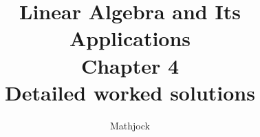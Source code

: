 
\title{\textbf{Linear Algebra and Its Applications}\\[0.3em]Chapter 4\\[0.3em]\large Detailed worked solutions}
\author{Mathjock}
\date{}

\maketitle
\bookinfo
\tableofcontents
\clearpage
\renewcommand{\thesection}{4.\arabic{section}}
\renewcommand{\theHsection}{4.\arabic{section}}
\setcounter{section}{0}

\clearpage
\renewcommand{\thesection}{4.\arabic{section}}
\renewcommand{\theHsection}{4.\arabic{section}}
\setcounter{section}{1}

\clearpage
\renewcommand{\thesection}{4.\arabic{section}}
\renewcommand{\theHsection}{4.\arabic{section}}
\setcounter{section}{2}

\clearpage
\renewcommand{\thesection}{4.\arabic{section}}
\renewcommand{\theHsection}{4.\arabic{section}}
\setcounter{section}{3}

\clearpage
\renewcommand{\thesection}{4.\arabic{section}}
\renewcommand{\theHsection}{4.\arabic{section}}
\setcounter{section}{4}

\clearpage
\renewcommand{\thesection}{4.\arabic{section}}
\renewcommand{\theHsection}{4.\arabic{section}}
\setcounter{section}{5}

\clearpage
\renewcommand{\thesection}{4.\arabic{section}}
\renewcommand{\theHsection}{4.\arabic{section}}
\setcounter{section}{6}

\clearpage
\renewcommand{\thesection}{4.\arabic{section}}
\renewcommand{\theHsection}{4.\arabic{section}}
\setcounter{section}{7}

\clearpage
\renewcommand{\thesection}{4.\arabic{section}}
\renewcommand{\theHsection}{4.\arabic{section}}
\setcounter{section}{8}

\clearpage
\renewcommand{\thesection}{4.S}
\renewcommand{\theHsection}{4.S}
\setcounter{section}{0}


